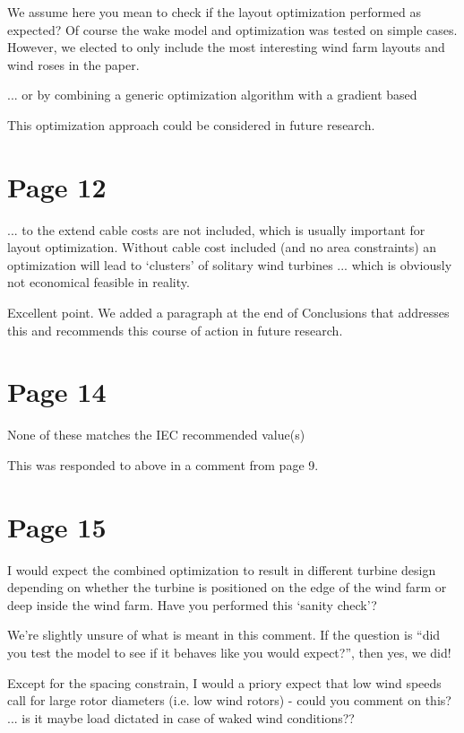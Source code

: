 \documentclass[12pt]{report}
\begin{document}
\color{blue} We assume here you mean to check if the layout optimization performed as expected? Of course the wake model and optimization was tested on simple cases. However, we elected to only include the most interesting wind farm layouts and wind roses in the paper.

\bigskip \color{black}
... or by combining a generic optimization algorithm with a gradient based

\color{blue} This optimization approach could be considered in future research.

\bigskip \color{black}
\section*{Page 12}
\bigskip \color{black}
 ... to the extend cable costs are not included, which is usually important for layout optimization. Without cable cost included (and no area constraints) an optimization will lead to `clusters' of solitary wind turbines ... which is obviously not economical feasible in reality.
 
 \color{blue} Excellent point. We added a paragraph at the end of Conclusions that addresses this and recommends this course of action in future research.
 
 \bigskip \color{black}
 \section*{Page 14}
 \bigskip \color{black}
 None of these matches the IEC recommended value(s)
 
 \color{blue} This was responded to above in a comment from page 9.
 
 \bigskip \color{black}
  \section*{Page 15}
  \bigskip \color{black}
 I would expect the combined optimization to result in different turbine design depending on whether the turbine is positioned on the edge of the wind farm or deep inside the wind farm. Have you performed this `sanity check'? 
 
 \color{blue} We're slightly unsure of what is meant in this comment. If the question is ``did you test the model to see if it behaves like you would expect?'', then yes, we did!
 
 \bigskip \color{black}
 Except for the spacing constrain, I would a priory expect that low wind speeds call for large rotor diameters (i.e. low wind rotors) - could you comment on this? ... is it maybe load dictated in case of waked wind conditions??
\end{document}
